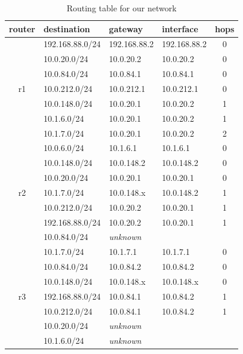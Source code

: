 \documentclass[parskip=full]{scrartcl}
\begin{document}
\begin{table}[hb]
    \centering
    \caption{Routing table for our network}
    \label{tab:routing}
    \begin{tabular}{clllc}
        \toprule
        \textbf{router} & \textbf{destination} & \textbf{gateway} & \textbf{interface} & \textbf{hops} \\ \midrule
           & 192.168.88.0/24 & 192.168.88.2 & 192.168.88.2 & 0 \\
           & 10.0.20.0/24    & 10.0.20.2    & 10.0.20.2    & 0 \\
           & 10.0.84.0/24    & 10.0.84.1    & 10.0.84.1    & 0 \\
        r1 & 10.0.212.0/24   & 10.0.212.1   & 10.0.212.1   & 0 \\
           & 10.0.148.0/24   & 10.0.20.1    & 10.0.20.2    & 1 \\
           & 10.1.6.0/24     & 10.0.20.1    & 10.0.20.2    & 1 \\
           & 10.1.7.0/24     & 10.0.20.1    & 10.0.20.2    & 2 \\
        \midrule
           & 10.0.6.0/24     & 10.1.6.1     & 10.1.6.1     & 0 \\
           & 10.0.148.0/24   & 10.0.148.2   & 10.0.148.2   & 0 \\
           & 10.0.20.0/24    & 10.0.20.1    & 10.0.20.1    & 0 \\
        r2 & 10.1.7.0/24     & 10.0.148.x   & 10.0.148.2   & 1 \\
           & 10.0.212.0/24   & 10.0.20.2    & 10.0.20.1    & 1 \\
           & 192.168.88.0/24 & 10.0.20.2    & 10.0.20.1    & 1 \\
           & 10.0.84.0/24    & \textit{unknown} \\
        \midrule
           & 10.1.7.0/24     & 10.1.7.1     & 10.1.7.1     & 0 \\
           & 10.0.84.0/24    & 10.0.84.2    & 10.0.84.2    & 0 \\
           & 10.0.148.0/24   & 10.0.148.x   & 10.0.148.x   & 0 \\
        r3 & 192.168.88.0/24 & 10.0.84.1    & 10.0.84.2    & 1 \\
           & 10.0.212.0/24   & 10.0.84.1    & 10.0.84.2    & 1 \\
           & 10.0.20.0/24    & \textit{unknown} \\
           & 10.1.6.0/24     & \textit{unknown} \\
        \bottomrule
    \end{tabular}
\end{table}
\end{document}
